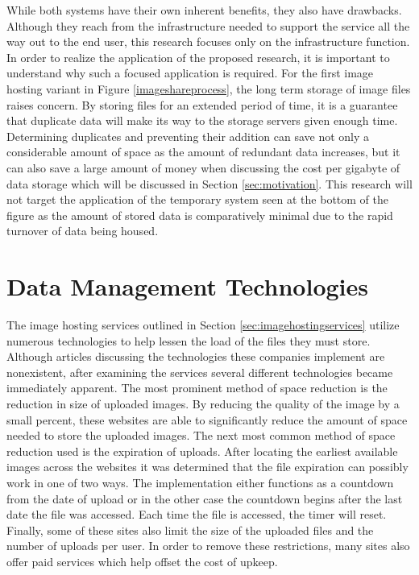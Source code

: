 While both systems have their own inherent benefits, they also have drawbacks. Although they reach from the infrastructure needed to support the service all the way out to the end user, this research focuses only on the infrastructure function. In order to realize the application of the proposed research, it is important to understand why such a focused application is required. For the first image hosting variant in Figure \ref{imageshareprocess}, the long term storage of image files raises concern. By storing files for an extended period of time, it is a guarantee that duplicate data will make its way to the storage servers given enough time. Determining duplicates and preventing their addition can save not only a considerable amount of space as the amount of redundant data increases, but it can also save a large amount of money when discussing the cost per gigabyte of data storage which will be discussed in Section \ref{sec:motivation}. This research will not target the application of the temporary system seen at the bottom of the figure as the amount of stored data is comparatively minimal due to the rapid turnover of data being housed.

\section{Data Management Technologies} \label{sec:datadeduptech}
The image hosting services outlined in Section \ref{sec:imagehostingservices} utilize numerous technologies to help lessen the load of the files they must store. Although articles discussing the technologies these companies implement are nonexistent, after examining the services several different technologies became immediately apparent. The most prominent method of space reduction is the reduction in size of uploaded images. By reducing the quality of the image by a small percent, these websites are able to significantly reduce the amount of space needed to store the uploaded images. The next most common method of space reduction used is the expiration of uploads. After locating the earliest available images across the websites it was determined that the file expiration can possibly work in one of two ways. The implementation either functions as a countdown from the date of upload or in the other case the countdown begins after the last date the file was accessed. Each time the file is accessed, the timer will reset. Finally, some of these sites also limit the size of the uploaded files and the number of uploads per user. In order to remove these restrictions, many sites also offer paid services which help offset the cost of upkeep. 


